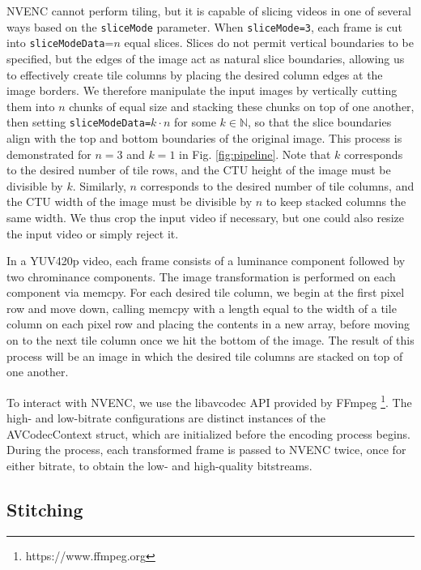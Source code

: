 NVENC cannot perform tiling, but it is capable of slicing videos in one of several ways based on the \texttt{sliceMode} parameter. When \texttt{sliceMode=3}, each frame is cut into \texttt{sliceModeData}=$n$ equal slices. Slices do not permit vertical boundaries to be specified, but the edges of the image act as natural slice boundaries, allowing us to effectively create tile columns by placing the desired column edges at the image borders. We therefore manipulate the input images by vertically cutting them into $n$ chunks of equal size and stacking these chunks on top of one another, then setting \texttt{sliceModeData=}$k \cdot n$ for some $k \in \mathbb{N}$, so that the slice boundaries align with the top and bottom boundaries of the original image. This process is demonstrated for $n=3$ and $k=1$ in Fig. \ref{fig:pipeline}. Note that $k$ corresponds to the desired number of tile rows, and the CTU height of the image must be divisible by $k$. Similarly, $n$ corresponds to the desired number of tile columns, and the CTU width of the image must be divisible by $n$ to keep stacked columns the same width. We thus crop the input video if necessary, but one could also resize the input video or simply reject it. 

In a YUV420p video, each frame consists of a luminance component followed by two chrominance components. The image transformation is performed on each component via memcpy. For each desired tile column, we begin at the first pixel row and move down, calling memcpy with a length equal to the width of a tile column on each pixel row and placing the contents in a new array, before moving on to the next tile column once we hit the bottom of the image. The result of this process will be an image in which the desired tile columns are stacked on top of one another.

To interact with NVENC, we use the libavcodec API provided by FFmpeg \footnote{https://www.ffmpeg.org}. The high- and low-bitrate configurations are distinct instances of the AVCodecContext struct, which are initialized before the encoding process begins. During the process, each transformed frame is passed to NVENC twice, once for either bitrate, to obtain the low- and high-quality bitstreams.

\subsection{Stitching}

